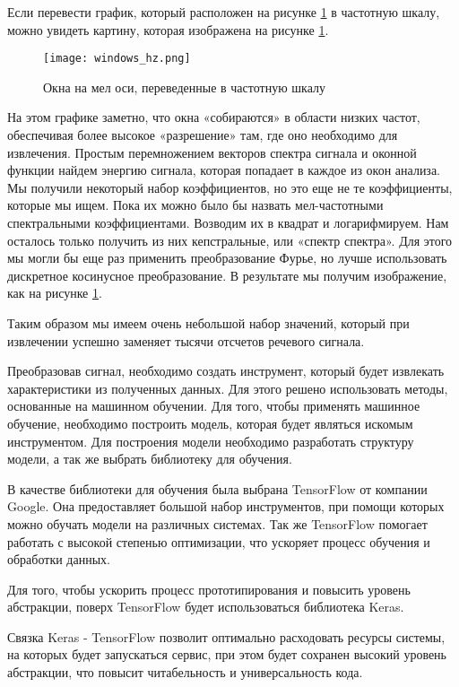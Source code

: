 Если перевести график, который расположен на рисунке \ref{sec:design:dev:windows_mel} в частотную шкалу, можно увидеть картину, которая изображена на рисунке \ref{sec:design:dev:windows_mel}.

\begin{figure}
\centering
	\texttt{[image: windows\_hz.png]}
	\caption{Окна на мел оси, переведенные в частотную шкалу}
	\label{sec:design:dev:windows_mel}
\end{figure}

На этом графике заметно, что окна «собираются» в области низких частот, обеспечивая более высокое «разрешение» там, где оно необходимо для извлечения. Простым перемножением векторов спектра сигнала и оконной функции найдем энергию сигнала, которая попадает в каждое из окон анализа. Мы получили некоторый набор коэффициентов, но это еще не те коэффициенты, которые мы ищем. Пока их можно было бы назвать мел-частотными спектральными коэффициентами. Возводим их в квадрат и логарифмируем. Нам осталось только получить из них кепстральные, или «спектр спектра». Для этого мы могли бы еще раз применить преобразование Фурье, но лучше использовать дискретное косинусное преобразование. В результате мы получим изображение, как на рисунке \ref{sec:design:dev:windows_mel}.

Таким образом мы имеем очень небольшой набор значений, который при извлечении успешно заменяет тысячи отсчетов речевого сигнала.

Преобразовав сигнал, необходимо создать инструмент, который будет извлекать характеристики из полученных данных. Для этого решено использовать методы, основанные на машинном обучении. Для того, чтобы применять машинное обучение, необходимо построить модель, которая будет являться искомым инструментом. Для построения модели необходимо разработать структуру модели, а так же выбрать библиотеку для обучения.

В качестве библиотеки для обучения была выбрана TensorFlow от компании Google. Она предоставляет большой набор инструментов, при помощи которых можно обучать модели на различных системах. Так же TensorFlow помогает работать с высокой степенью оптимизации, что ускоряет процесс обучения и обработки данных.

Для того, чтобы ускорить процесс прототипирования и повысить уровень абстракции, поверх TensorFlow будет использоваться библиотека Keras.

Связка Keras - TensorFlow позволит оптимально расходовать ресурсы системы, на которых будет запускаться сервис, при этом будет сохранен высокий уровень абстракции, что повысит читабельность и универсальность кода.

